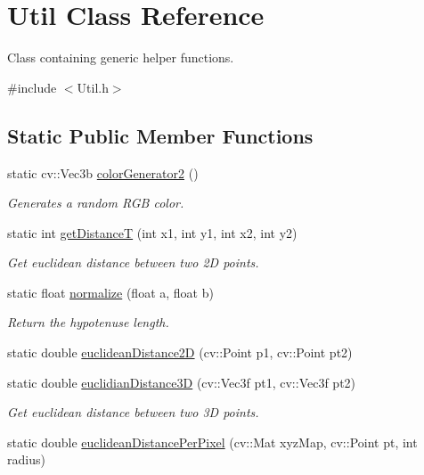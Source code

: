 \hypertarget{class_util}{}\section{Util Class Reference}
\label{class_util}


Class containing generic helper functions.  




{\ttfamily \#include $<$Util.\+h$>$}

\subsection*{Static Public Member Functions}
\begin{DoxyCompactItemize}
\item 
static cv\+::\+Vec3b \hyperlink{class_util_a4b35aebe2f6ea734a9221356c0ad38ec}{color\+Generator2} ()
\begin{DoxyCompactList}\small\item\em Generates a random R\+GB color. \end{DoxyCompactList}\item 
static int \hyperlink{class_util_a1213364e3ea975aa7f3713f3ad5a96a7}{get\+DistanceT} (int x1, int y1, int x2, int y2)
\begin{DoxyCompactList}\small\item\em Get euclidean distance between two 2D points. \end{DoxyCompactList}\item 
static float \hyperlink{class_util_a003878685d2eba96fadc4fdae502688e}{normalize} (float a, float b)
\begin{DoxyCompactList}\small\item\em Return the hypotenuse length. \end{DoxyCompactList}\item 
static double \hyperlink{class_util_a4212455c03e1a5ec0262f1df778bdc47}{euclidean\+Distance2D} (cv\+::\+Point p1, cv\+::\+Point pt2)
\item 
static double \hyperlink{class_util_afcaa0a0b92e0fd117be8dead6a7787f3}{euclidian\+Distance3D} (cv\+::\+Vec3f pt1, cv\+::\+Vec3f pt2)
\begin{DoxyCompactList}\small\item\em Get euclidean distance between two 3D points. \end{DoxyCompactList}\item 
static double \hyperlink{class_util_ad189ee83cefd79e724047cb6283eb4ac}{euclidean\+Distance\+Per\+Pixel} (cv\+::\+Mat xyz\+Map, cv\+::\+Point pt, int radius)

\end{DoxyCompactItemize}
